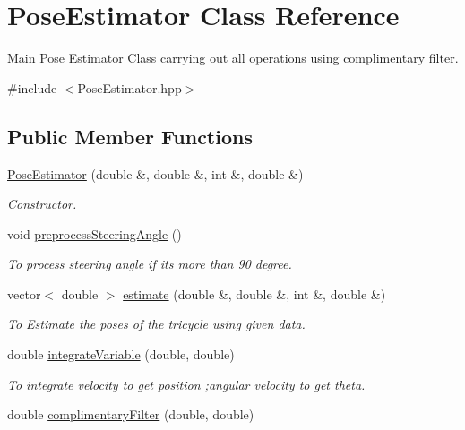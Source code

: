 \hypertarget{classPoseEstimator}{}\section{Pose\+Estimator Class Reference}
\label{classPoseEstimator}


Main Pose Estimator Class carrying out all operations using complimentary filter.  




{\ttfamily \#include $<$Pose\+Estimator.\+hpp$>$}

\subsection*{Public Member Functions}
\begin{DoxyCompactItemize}
\item 
\hyperlink{classPoseEstimator_ab849608b7d2bc4b7c9e3bee1219a3997}{Pose\+Estimator} (double \&, double \&, int \&, double \&)
\begin{DoxyCompactList}\small\item\em Constructor. \end{DoxyCompactList}\item 
void \hyperlink{classPoseEstimator_a68fc4e65d149c62721d5f6d25e7f0181}{preprocess\+Steering\+Angle} ()
\begin{DoxyCompactList}\small\item\em To process steering angle if its more than 90 degree. \end{DoxyCompactList}\item 
vector$<$ double $>$ \hyperlink{classPoseEstimator_adafcdfe397a5f4242429ac8b6fc44d5e}{estimate} (double \&, double \&, int \&, double \&)
\begin{DoxyCompactList}\small\item\em To Estimate the poses of the tricycle using given data. \end{DoxyCompactList}\item 
double \hyperlink{classPoseEstimator_aabd43cbb110bf359e4236d055730cf39}{integrate\+Variable} (double, double)
\begin{DoxyCompactList}\small\item\em To integrate velocity to get position ;angular velocity to get theta. \end{DoxyCompactList}\item 
double \hyperlink{classPoseEstimator_a3d51891c28fb88bb320678b499a1baec}{complimentary\+Filter} (double, double)

\end{DoxyCompactItemize}
